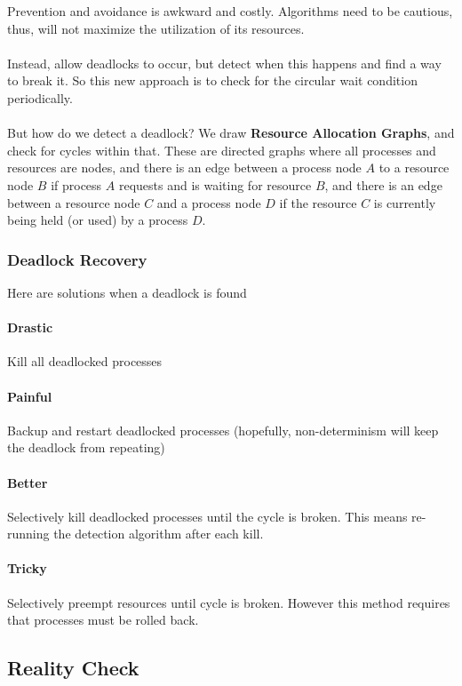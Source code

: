 \documentclass{article}
\begin{document}
Prevention and avoidance is awkward and costly. Algorithms need to be cautious, thus, will not maximize the utilization of its resources.
\\
\\
Instead, allow deadlocks to occur, but detect when this happens and find a way to break it.  So this new approach is to check for the circular wait condition periodically.
\\
\\
But how do we detect a deadlock? We draw \textbf{Resource Allocation Graphs}, and check for cycles within that. These are directed graphs where all processes and resources are nodes, and there is an edge between a process node $A$ to a resource node $B$ if process $A$ requests and is waiting for resource $B$, and there is an edge between a resource node $C$ and a process node $D$ if the resource $C$ is currently being held (or used) by a process $D$.

\subsubsection{Deadlock Recovery}

Here are solutions when a deadlock is found

\paragraph{Drastic} Kill all deadlocked processes

\paragraph{Painful} Backup and restart deadlocked processes (hopefully, non-determinism will keep the deadlock from repeating)

\paragraph{Better} Selectively kill deadlocked processes until the cycle is broken. This means re-running the detection algorithm after each kill.

\paragraph{Tricky} Selectively preempt resources until cycle is broken. However this method requires that processes must be rolled back.

\subsection{Reality Check}
\end{document}
